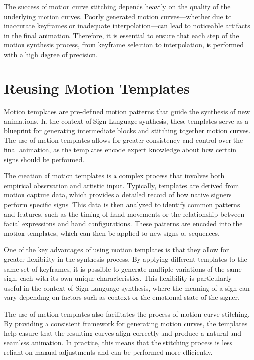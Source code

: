 \documentclass[../../main.tex]{subfiles}
\begin{document}
The success of motion curve stitching depends heavily on the quality of the underlying motion curves. Poorly generated motion curves—whether due to inaccurate keyframes or inadequate interpolation—can lead to noticeable artifacts in the final animation. Therefore, it is essential to ensure that each step of the motion synthesis process, from keyframe selection to interpolation, is performed with a high degree of precision.

\section{Reusing Motion Templates}

Motion templates are pre-defined motion patterns that guide the synthesis of new animations. In the context of Sign Language synthesis, these templates serve as a blueprint for generating intermediate blocks and stitching together motion curves. The use of motion templates allows for greater consistency and control over the final animation, as the templates encode expert knowledge about how certain signs should be performed.

The creation of motion templates is a complex process that involves both empirical observation and artistic input. Typically, templates are derived from motion capture data, which provides a detailed record of how native signers perform specific signs. This data is then analyzed to identify common patterns and features, such as the timing of hand movements or the relationship between facial expressions and hand configurations. These patterns are encoded into the motion templates, which can then be applied to new signs or sequences.

One of the key advantages of using motion templates is that they allow for greater flexibility in the synthesis process. By applying different templates to the same set of keyframes, it is possible to generate multiple variations of the same sign, each with its own unique characteristics. This flexibility is particularly useful in the context of Sign Language synthesis, where the meaning of a sign can vary depending on factors such as context or the emotional state of the signer.

The use of motion templates also facilitates the process of motion curve stitching. By providing a consistent framework for generating motion curves, the templates help ensure that the resulting curves align correctly and produce a natural and seamless animation. In practice, this means that the stitching process is less reliant on manual adjustments and can be performed more efficiently.
\end{document}
